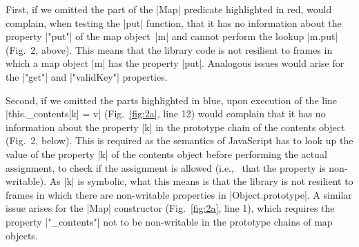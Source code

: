 \setcounter{figure}{2} 
First, if we omitted the part of the \jsinline|Map| predicate highlighted in red, \cosette would complain, when testing the \jsinline|put| function, that it has no information about the property \jsinline|"put"| of the map object~\jsinline|m| and cannot perform the lookup \jsinline|m.put| (Fig.~2, above). This means that the library code is not resilient to frames in which a map object \jsinline|m| has the property \jsinline|put|.
Analogous issues would arise for the \jsinline|"get"| and \jsinline|"validKey"| properties.%

Second, if we omitted the parts highlighted in blue, upon execution of the line \jsinline|this._contents[k] = v| (Fig.~\ref{fig:2a}, line 12) \cosette would complain that it has no information about the property \jsinline|k| in the prototype chain of the contents object (Fig.~2, below). This is required as the semantics of JavaScript has to look up the value of the property \jsinline|k| of the contents object before performing the actual assignment, to check if the assignment is allowed (i.e.,~ that the property is non-writable). As \jsinline|k| is symbolic, what this means is that the library is not resilient to frames in which there are non-writable properties in \jsinline|Object.prototype|. A similar issue arises for the \jsinline|Map| constructor (Fig.~\ref{fig:2a}, line 1), which requires the property \jsinline|"_contents"| not to be non-writable in the prototype chains of map objects.

